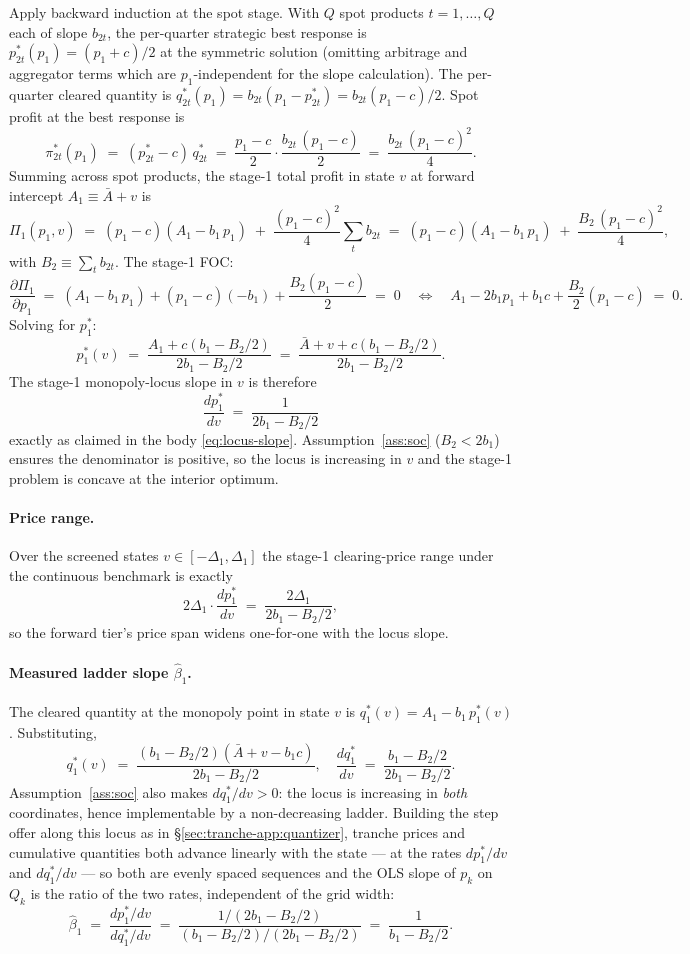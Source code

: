 \documentclass[11pt,a4paper]{article}
\theoremstyle{definition}
\theoremstyle{remark}
\theoremstyle{plain}
\begin{document}
Apply backward induction at the spot stage. With $Q$ spot products $t = 1, \dots, Q$ each of slope $b_{2t}$, the per-quarter strategic best response is $p_{2t}^*(p_1) = (p_1 + c)/2$ at the symmetric solution (omitting arbitrage and aggregator terms which are $p_1$-independent for the slope calculation). The per-quarter cleared quantity is $q_{2t}^*(p_1) = b_{2t}(p_1 - p_{2t}^*) = b_{2t}(p_1 - c)/2$. Spot profit at the best response is
\[
\pi_{2t}^*(p_1) \;=\; (p_{2t}^* - c)\,q_{2t}^* \;=\; \frac{p_1 - c}{2}\cdot \frac{b_{2t}\,(p_1 - c)}{2} \;=\; \frac{b_{2t}\,(p_1 - c)^2}{4}.
\]
Summing across spot products, the stage-1 total profit in state $v$ at forward intercept $A_1 \equiv \bar A + v$ is
\[
\Pi_1(p_1, v) \;=\; (p_1 - c)(A_1 - b_1\,p_1) \;+\; \frac{(p_1 - c)^2}{4}\sum_t b_{2t} \;=\; (p_1 - c)(A_1 - b_1\,p_1) \;+\; \frac{B_2\,(p_1 - c)^2}{4},
\]
with $B_2 \equiv \sum_t b_{2t}$. The stage-1 FOC:
\[
\frac{\partial \Pi_1}{\partial p_1} \;=\; (A_1 - b_1\,p_1) + (p_1 - c)(-b_1) + \frac{B_2 (p_1 - c)}{2} \;=\; 0
\quad\Longleftrightarrow\quad
A_1 - 2 b_1 p_1 + b_1 c + \frac{B_2}{2}(p_1 - c) \;=\; 0.
\]
Solving for $p_1^*$:
\[
p_1^*(v) \;=\; \frac{A_1 + c(b_1 - B_2/2)}{2 b_1 - B_2/2} \;=\; \frac{\bar A + v + c(b_1 - B_2/2)}{2 b_1 - B_2/2}.
\]
The stage-1 monopoly-locus slope in $v$ is therefore
\[
\boxed{\;\frac{dp_1^*}{dv} \;=\; \frac{1}{2 b_1 - B_2/2}\;}
\]
exactly as claimed in the body \eqref{eq:locus-slope}. Assumption~\ref{ass:soc} ($B_2 < 2 b_1$) ensures the denominator is positive, so the locus is increasing in $v$ and the stage-1 problem is concave at the interior optimum.

\paragraph{Price range.} Over the screened states $v \in [-\Delta_1, \Delta_1]$ the stage-1 clearing-price range under the continuous benchmark is exactly
\[
2\Delta_1 \cdot \frac{dp_1^*}{dv} \;=\; \frac{2\Delta_1}{2 b_1 - B_2/2},
\]
so the forward tier's price span widens one-for-one with the locus slope.

\paragraph{Measured ladder slope $\hat\beta_1$.} The cleared quantity at the monopoly point in state $v$ is $q_1^*(v) = A_1 - b_1\,p_1^*(v)$. Substituting,
\[
q_1^*(v) \;=\; \frac{(b_1 - B_2/2)(\bar A + v - b_1 c)}{2 b_1 - B_2/2},
\quad
\frac{dq_1^*}{dv} \;=\; \frac{b_1 - B_2/2}{2 b_1 - B_2/2}.
\]
Assumption~\ref{ass:soc} also makes $dq_1^*/dv > 0$: the locus is increasing in \emph{both} coordinates, hence implementable by a non-decreasing ladder. Building the step offer along this locus as in \S\ref{sec:tranche-app:quantizer}, tranche prices and cumulative quantities both advance linearly with the state --- at the rates $dp_1^*/dv$ and $dq_1^*/dv$ --- so both are evenly spaced sequences and the OLS slope of $p_k$ on $Q_k$ is the ratio of the two rates, independent of the grid width:
\[
\hat\beta_1 \;=\; \frac{dp_1^*/dv}{dq_1^*/dv} \;=\; \frac{1/(2 b_1 - B_2/2)}{(b_1 - B_2/2)/(2 b_1 - B_2/2)} \;=\; \frac{1}{b_1 - B_2/2}.
\]
\end{document}
